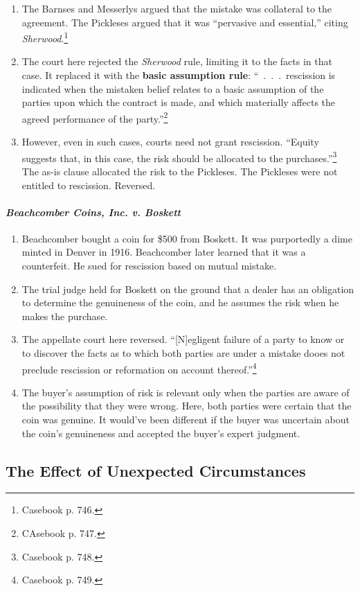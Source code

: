 \begin{enumerate}
    \item The Barnses and Messerlys argued that the mistake was collateral to 
    the agreement. The Pickleses argued that it was ``pervasive and 
    essential,'' citing \emph{Sherwood}.\footnote{Casebook p. 746.}
    \item The court here rejected the \emph{Sherwood} rule, limiting it to the 
    facts in that case. It replaced it with the \textbf{basic assumption 
    rule}: ``~.~.~.~rescission is indicated when the mistaken belief relates 
    to a basic assumption of the parties upon which the contract is made, and 
    which materially affects the agreed performance of the 
    party.''\footnote{CAsebook p. 747.}
    \item However, even in such cases, courts need not grant rescission. 
    ``Equity suggests that, in this case, the risk should be allocated to the 
    purchases.''\footnote{Casebook p. 748.} The as-is clause allocated the 
    risk to the Pickleses. The Pickleses were not entitled to rescission. 
    Reversed.
\end{enumerate}

\paragraph{\emph{Beachcomber Coins, Inc. v. Boskett}}

\begin{enumerate}
    \item Beachcomber bought a coin for \$500 from Boskett. It was purportedly 
    a dime minted in Denver in 1916. Beachcomber later learned that it was a 
    counterfeit. He sued for rescission based on mutual mistake.
    \item The trial judge held for Boskett on the ground that a dealer has an 
    obligation to determine the genuineness of the coin, and he assumes the 
    risk when he makes the purchase.
    \item The appellate court here reversed. ``[N]egligent failure of a party 
    to know or to discover the facts as to which both parties are under a 
    mistake dooes not preclude rescission or reformation on account 
    thereof.''\footnote{Casebook p. 749.}
    \item The buyer's assumption of risk is relevant only when the parties are 
    aware of the possibility that they were wrong. Here, both parties were 
    certain that the coin was genuine. It would've been different if the buyer 
    was uncertain about the coin's genuineness and accepted the buyer's expert 
    judgment.
\end{enumerate}

\subsection{The Effect of Unexpected Circumstances}


